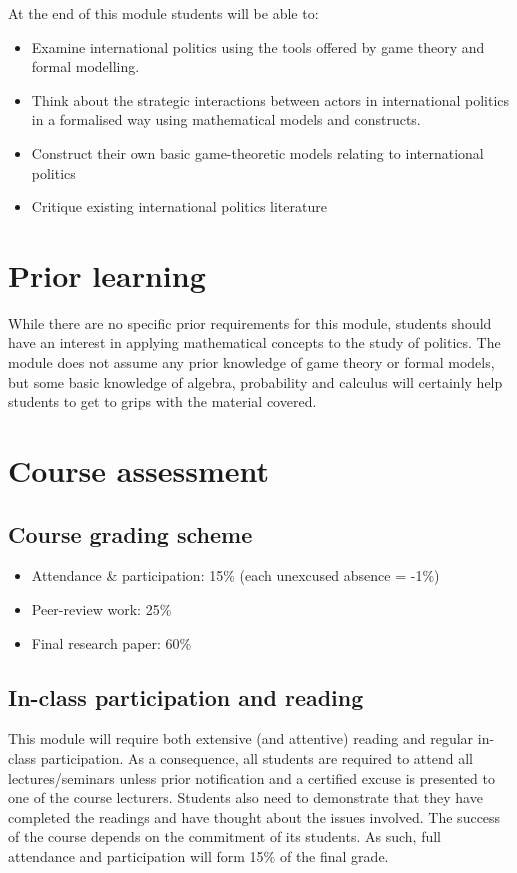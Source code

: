 \documentclass[12pt,a4paper]{article}
\begin{document}
At the end of this module students will be able to:

\begin{itemize}
	\item Examine international politics using the tools offered by game theory and formal modelling. 
	\item Think about the strategic interactions between actors in international politics in a formalised way using mathematical models and constructs.
	\item Construct their own basic game-theoretic models relating to international politics
	\item Critique existing international politics literature 
\end{itemize}

\section*{Prior learning}

While there are no specific prior requirements for this module, students should have an interest in applying mathematical concepts to the study of politics. The module does not assume any prior knowledge of game theory or formal models, but some basic knowledge of algebra, probability and calculus will certainly help students to get to grips with the material covered.

\section*{Course assessment}

\subsection*{Course grading scheme}

\begin{itemize}
	\item Attendance \& participation: 15\% (each unexcused absence = -1\%) 
	\item Peer-review work: 25\%
	\item Final research paper: 60\%
\end{itemize}

\subsection*{In-class participation and reading}

This module will require both extensive (and attentive) reading and regular in-class participation. As a consequence, all students are required to attend all lectures/seminars unless prior notification and a certified excuse is presented to one of the course lecturers. Students also need to demonstrate that they have completed the readings and have thought about the issues involved. The success of the course depends on the commitment of its students. As such, full attendance and participation will form 15\% of the final grade.
\end{document}
